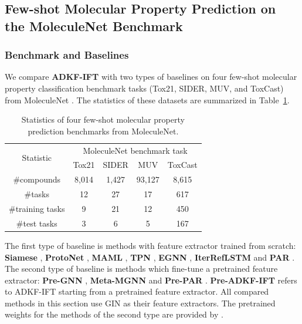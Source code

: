     \subsection{Few-shot Molecular Property Prediction on the MoleculeNet Benchmark}\label{sec:few-shot-experiments-molnet}
    
        \subsubsection{Benchmark and Baselines}
        We compare \textbf{ADKF-IFT} with two types of baselines on four few-shot molecular property
        classification benchmark tasks (Tox21, SIDER, MUV, and ToxCast) from MoleculeNet
        \citep{wu2018moleculenet}.
        The statistics of these datasets are summarized in Table~\ref{tab:molnet tasks}.

        \begin{table}[ht]
        \footnotesize
        \caption{Statistics of four few-shot molecular property prediction benchmarks from MoleculeNet.}
        \label{tab:molnet tasks}
        \centering
        \begin{tabular}{ccccc}
                \toprule
                \multirow{2}[3]{*}{Statistic} & \multicolumn{4}{c}{MoleculeNet benchmark task}\\
                \cmidrule(lr){2-5}
                & Tox21 & SIDER & MUV & ToxCast \\
                \midrule
                \#compounds & 8,014 & 1,427 & 93,127 & 8,615 \\
                \#tasks & 12 & 27 & 17 & 617  \\
                \#training tasks & 9 & 21 & 12 & 450  \\
                \#test tasks & 3 & 6 & 5 & 167 \\
                \bottomrule
            \end{tabular}
    \end{table}
        
        The first type of baseline is methods with feature extractor trained from scratch:
        \textbf{Siamese} \citep{Koch2015SiameseNN}, \textbf{ProtoNet} \citep{snell2017prototypical},
        \textbf{MAML} \citep{finn17a}, \textbf{TPN} \citep{liu2018learning},
        \textbf{EGNN} \citep{Kim2019EdgeLabelingGN}, \textbf{IterRefLSTM} \citep{AltaeTran2017LowDD} and
        \textbf{PAR} \citep{wang2021property}.
        The second type of baseline is methods which fine-tune a pretrained feature extractor:
        \textbf{Pre-GNN} \citep{Hu*2020Strategies}, \textbf{Meta-MGNN} \citep{guo2021few} and
        \textbf{Pre-PAR} \citep{wang2021property}.
        \textbf{Pre-ADKF-IFT} refers to ADKF-IFT starting from a pretrained feature extractor.
        All compared methods in this section use GIN \citep{Xu2019HowPA} as their feature extractors.
        The pretrained weights for the methods of the second type are provided by \citet{Hu*2020Strategies}.
        
